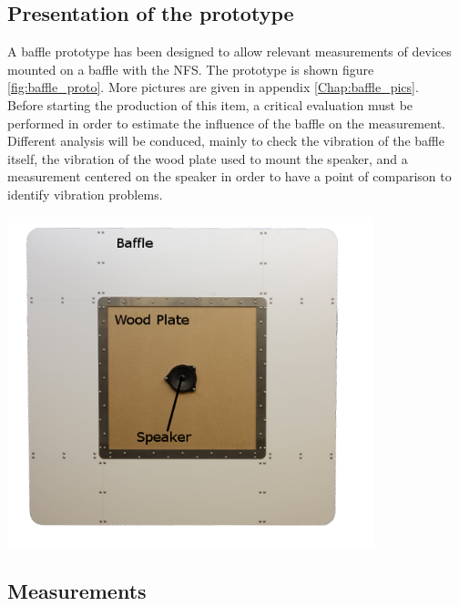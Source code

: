 \documentclass{report}
\begin{document}
\subsection{Presentation of the prototype}

\begin{minipage}{0.6\textwidth}
A baffle prototype has been designed to allow relevant measurements of devices mounted on a baffle with the NFS. The prototype is shown figure \ref{fig:baffle_proto}. More pictures are given in appendix \ref{Chap:baffle_pics}. \\

Before starting the production of this item, a critical evaluation must be performed in order to estimate the influence of the baffle on the measurement. Different analysis will be conduced, mainly to check the vibration of the baffle itself, the vibration of the wood plate used to mount the speaker, and a measurement centered on the speaker in order to have a point of comparison to identify vibration problems.
\end{minipage}
\begin{minipage}{0.4\textwidth}
\begin{center}
	\includegraphics[width=0.8\textwidth]{GridOpti/Baffle_Alone_2} 
    \captionsetup{hypcap=false} 
	\label{fig:baffle_proto}
\end{center}
\end{minipage} 

\subsection{Measurements}
\end{document}
